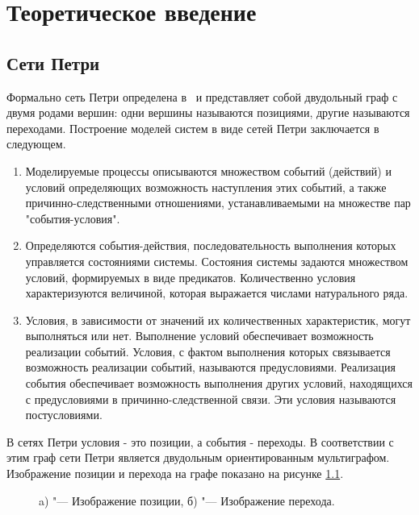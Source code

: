 \chapter{Теоретическое введение}
	\label{chap:one}
\section{Сети Петри}

Формально сеть Петри определена в~\cite{piterson} и представляет собой двудольный граф с двумя родами вершин: одни вершины называются позициями, другие
называются переходами. 
Построение моделей систем в виде сетей Петри заключается в следующем.
\begin{enumerate}
	\item 	Моделируемые процессы описываются множеством событий (действий) и условий определяющих возможность наступления этих событий, а также причинно-следственными отношениями, устанавливаемыми на множестве пар "события-условия".
	\item Определяются события-действия, последовательность выполнения которых управляется состояниями системы. Состояния системы задаются множеством условий, формируемых в виде предикатов. Количественно условия характеризуются величиной, которая выражается числами натурального ряда.
\item Условия, в зависимости от значений их количественных характеристик, могут выполняться или нет. Выполнение условий обеспечивает возможность реализации событий. Условия, с фактом выполнения которых связывается возможность реализации событий, называются предусловиями. Реализация события обеспечивает возможность выполнения других условий, находящихся с предусловиями в причинно-следственной связи. Эти условия называются постусловиями.
\end{enumerate}

В сетях Петри условия - это позиции, а события - переходы. В соответствии с этим граф сети Петри является двудольным ориентированным мультиграфом. Изображение позиции и перехода на графе показано на рисунке \ref{img:example}.

\begin{figure}[h!]
	\begin{minipage}[ht]{0.49\linewidth}
	\end{minipage}
	\hfill
	\begin{minipage}[ht]{0.49\linewidth}
	\end{minipage}
	\caption{a) "--- Изображение позиции, б) "--- Изображение перехода. }
	\label{img:example}  
\end{figure}

